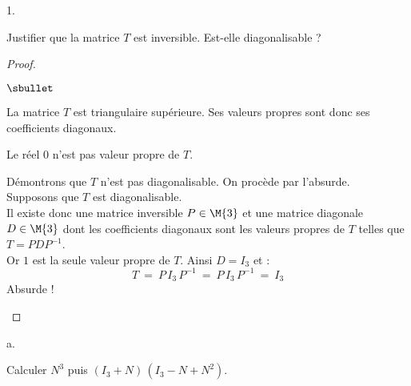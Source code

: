 \documentclass[11pt]{article}%
\begin{document}
\begin{noliste}{1.}
  \setlength{\itemsep}{4mm} %
  \setcounter{enumi}{8}
\item Justifier que la matrice $T$ est inversible. Est-elle
  diagonalisable ?

  \begin{proof}~%
    \begin{noliste}{$\sbullet$}
    \item La matrice $T$ est triangulaire supérieure. Ses valeurs
      propres sont donc ses coefficients diagonaux. %

    \item Le réel $0$ n'est pas valeur propre de $T$. %

    \item Démontrons que $T$ n'est pas diagonalisable. On procède par
      l'absurde.\\
      Supposons que $T$ est diagonalisable.\\
      Il existe donc une matrice inversible $P \in \M{3}$ et une
      matrice diagonale $D \in \M{3}$ dont les coefficients diagonaux
      sont les valeurs propres de $T$ telles que $T = PDP^{-1}$.\\
      Or $1$ est la seule valeur propre de $T$. Ainsi $D = I_3$ et :
      \[
      T \ = \ P \, I_3 \, P^{-1} \ = \ P \, I_3 \, P^{-1} \ = \ I_3
      \]
      Absurde !%
      ~\\[-1.6cm]
    \end{noliste}
  \end{proof}

\item 
  \begin{noliste}{a.}
    \setlength{\itemsep}{2mm} %
  \item Calculer $N^3$ puis $(I_3 + N) \, (I_3 - N + N^2)$.


\end{noliste}
\end{noliste}
\end{document}
